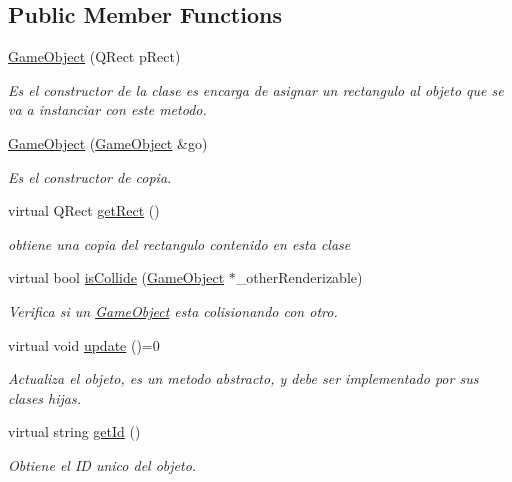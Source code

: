 \subsection*{Public Member Functions}
\begin{DoxyCompactItemize}
\item 
\hyperlink{class_game_object_a439d121ac13b4727d0bbb850e1ada980}{Game\-Object} (Q\-Rect p\-Rect)
\begin{DoxyCompactList}\small\item\em Es el constructor de la clase es encarga de asignar un rectangulo al objeto que se va a instanciar con este metodo. \end{DoxyCompactList}\item 
\hyperlink{class_game_object_aefff75a70a358b683a9e698b05abd3dd}{Game\-Object} (\hyperlink{class_game_object}{Game\-Object} \&go)
\begin{DoxyCompactList}\small\item\em Es el constructor de copia. \end{DoxyCompactList}\item 
virtual Q\-Rect \hyperlink{class_game_object_a529e5908a2c7a95fe3cd0f47958471b4}{get\-Rect} ()
\begin{DoxyCompactList}\small\item\em obtiene una copia del rectangulo contenido en esta clase \end{DoxyCompactList}\item 
virtual bool \hyperlink{class_game_object_a4d7f7506ab6fa6442367844cd8202fb6}{is\-Collide} (\hyperlink{class_game_object}{Game\-Object} $\ast$\-\_\-other\-Renderizable)
\begin{DoxyCompactList}\small\item\em Verifica si un \hyperlink{class_game_object}{Game\-Object} esta colisionando con otro. \end{DoxyCompactList}\item 
virtual void \hyperlink{class_game_object_ae83128d0e0efef691417779605ee037c}{update} ()=0
\begin{DoxyCompactList}\small\item\em Actualiza el objeto, es un metodo abstracto, y debe ser implementado por sus clases hijas. \end{DoxyCompactList}\item 
virtual string \hyperlink{class_game_object_a340e4594b8eafacc5bd6f7e390b43f53}{get\-Id} ()
\begin{DoxyCompactList}\small\item\em Obtiene el I\-D unico del objeto. \end{DoxyCompactList}\item 

\end{DoxyCompactItemize}
